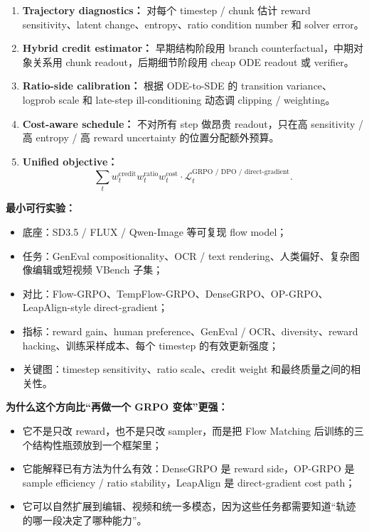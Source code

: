 \begin{enumerate}[leftmargin=1.5em]
  \item \textbf{Trajectory diagnostics：} 对每个 timestep / chunk 估计 reward sensitivity、latent change、entropy、ratio condition number 和 solver error。
  \item \textbf{Hybrid credit estimator：} 早期结构阶段用 branch counterfactual，中期对象关系用 chunk readout，后期细节阶段用 cheap ODE readout 或 verifier。
  \item \textbf{Ratio-side calibration：} 根据 ODE-to-SDE 的 transition variance、logprob scale 和 late-step ill-conditioning 动态调 clipping / weighting。
  \item \textbf{Cost-aware schedule：} 不对所有 step 做昂贵 readout，只在高 sensitivity / 高 entropy / 高 reward uncertainty 的位置分配额外预算。
  \item \textbf{Unified objective：}
  \[
  \sum_t
  w_t^\text{credit}
  w_t^\text{ratio}
  w_t^\text{cost}
  \cdot
  \mathcal{L}_t^\text{GRPO / DPO / direct-gradient}.
  \]
\end{enumerate}

\textbf{最小可行实验：}

\begin{itemize}[leftmargin=1.5em]
  \item 底座：SD3.5 / FLUX / Qwen-Image 等可复现 flow model；
  \item 任务：GenEval compositionality、OCR / text rendering、人类偏好、复杂图像编辑或短视频 VBench 子集；
  \item 对比：Flow-GRPO、TempFlow-GRPO、DenseGRPO、OP-GRPO、LeapAlign-style direct-gradient；
  \item 指标：reward gain、human preference、GenEval / OCR、diversity、reward hacking、训练采样成本、每个 timestep 的有效更新强度；
  \item 关键图：timestep sensitivity、ratio scale、credit weight 和最终质量之间的相关性。
\end{itemize}

\textbf{为什么这个方向比“再做一个 GRPO 变体”更强：}

\begin{itemize}[leftmargin=1.5em]
  \item 它不是只改 reward，也不是只改 sampler，而是把 Flow Matching 后训练的三个结构性瓶颈放到一个框架里；
  \item 它能解释已有方法为什么有效：DenseGRPO 是 reward side，OP-GRPO 是 sample efficiency / ratio stability，LeapAlign 是 direct-gradient cost path；
  \item 它可以自然扩展到编辑、视频和统一多模态，因为这些任务都需要知道“轨迹的哪一段决定了哪种能力”。
\end{itemize}

